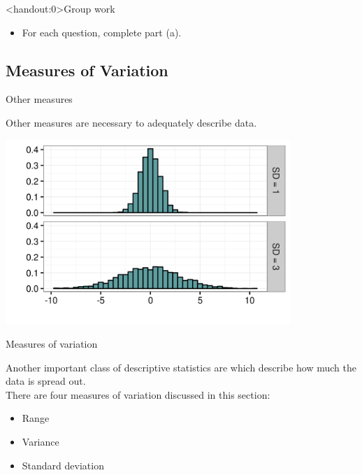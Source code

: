 \documentclass[xcolor=table, handout]{beamer}
\begin{document}
\begin{frame}<handout:0>{Group work}
\begin{block}{}
\large
\begin{itemize}
\item For each question, complete part (a).
\end{itemize}
\end{block}
\end{frame}



\subsection{Measures of Variation}

\begin{frame}{Other measures}
\begin{block}{}
\large
Other measures are necessary to adequately describe data.
\end{block}
\pause
\bigskip
{\centering
\includegraphics[width=4.25in]{../images/ch03_var_diff}
\par}
\end{frame}

\begin{frame}{Measures of variation}
\begin{block}{}
\large
Another important class of descriptive statistics are  which describe how much the data is spread out.\\
\medskip
There are four measures of variation discussed in this section:
\begin{itemize}
\item Range
\item Variance
\item Standard deviation
\end{itemize}

\end{block}
\end{frame}
\end{document}
